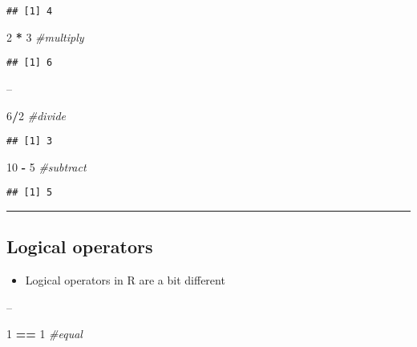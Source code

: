 \documentclass[]{article}
\newenvironment{Shaded}{\begin{snugshade}}{\end{snugshade}}
\newcommand{\CommentTok}[1]{\textcolor[rgb]{0.56,0.35,0.01}{\textit{#1}}}
\newcommand{\DecValTok}[1]{\textcolor[rgb]{0.00,0.00,0.81}{#1}}
\newcommand{\OperatorTok}[1]{\textcolor[rgb]{0.81,0.36,0.00}{\textbf{#1}}}
\newcommand{\StringTok}[1]{\textcolor[rgb]{0.31,0.60,0.02}{#1}}
\providecommand{\tightlist}{%
  \setlength{\itemsep}{0pt}\setlength{\parskip}{0pt}}
\begin{document}
\begin{verbatim}
## [1] 4
\end{verbatim}

\begin{Shaded}
\begin{Highlighting}[]
\DecValTok{2} \OperatorTok{*}\StringTok{ }\DecValTok{3} \CommentTok{#multiply}
\end{Highlighting}
\end{Shaded}

\begin{verbatim}
## [1] 6
\end{verbatim}

--

\begin{Shaded}
\begin{Highlighting}[]
\DecValTok{6}\OperatorTok{/}\DecValTok{2} \CommentTok{#divide}
\end{Highlighting}
\end{Shaded}

\begin{verbatim}
## [1] 3
\end{verbatim}

\begin{Shaded}
\begin{Highlighting}[]
\DecValTok{10} \OperatorTok{-}\StringTok{ }\DecValTok{5} \CommentTok{#subtract}
\end{Highlighting}
\end{Shaded}

\begin{verbatim}
## [1] 5
\end{verbatim}

\begin{center}\rule{0.5\linewidth}{\linethickness}\end{center}

\hypertarget{logical-operators}{%
\subsection{Logical operators}\label{logical-operators}}

\begin{itemize}
\tightlist
\item
  Logical operators in R are a bit different
\end{itemize}

--

\begin{Shaded}
\begin{Highlighting}[]
\DecValTok{1} \OperatorTok{==}\StringTok{ }\DecValTok{1} \CommentTok{#equal}
\end{Highlighting}
\end{Shaded}
\end{document}
